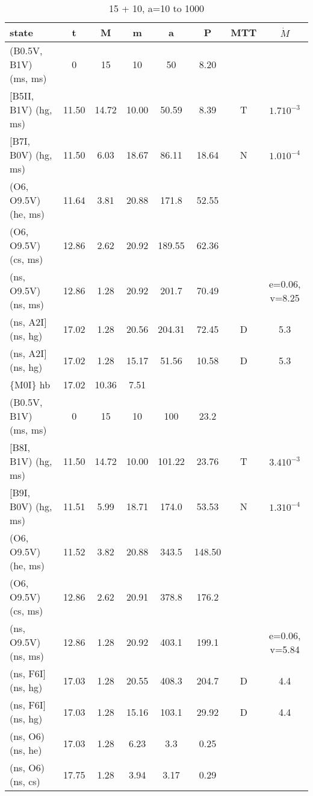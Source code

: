 \documentclass{article}
\begin{document}
\begin{table}
\caption{15 + 10, a=10 to 1000}
\begin{tabular}{p{4cm}ccccccc}
\hline
state 		    	& t 	& M	& m	& a	& P	& MTT	&$\dot{M}$		\\ \hline 
(B0.5V, B1V) (ms, ms)	& 0	& 15	& 10	& 50	& 8.20	&       &			\\
$[$B5II, B1V) (hg, ms)	& 11.50	& 14.72	& 10.00	& 50.59	& 8.39	& T	& $1.7 10^{-3}$		\\
$[$B7I, B0V) (hg, ms)	& 11.50	& 6.03	& 18.67	& 86.11	& 18.64	& N	& $1.0 10^{-4}$		\\
(O6, O9.5V) (he, ms)	& 11.64	& 3.81	& 20.88	& 171.8	& 52.55	&       &                       \\
(O6, O9.5V) (cs, ms)	& 12.86	& 2.62	& 20.92	& 189.55& 62.36	&       &                       \\
(ns, O9.5V) (ns, ms)	& 12.86	& 1.28	& 20.92	& 201.7	& 70.49	&       & e=0.06, v=8.25        \\
(ns, A2I$]$ (ns, hg)	& 17.02	& 1.28	& 20.56	& 204.31& 72.45	& D	& 5.3         		\\
(ns, A2I$]$ (ns, hg)	& 17.02	& 1.28	& 15.17	& 51.56 & 10.58	& D	& 5.3         		\\
\{M0I\} hb        	& 17.02	& 10.36	& 7.51 	&       &      	&    	&             		\\ 
\hline
(B0.5V, B1V) (ms, ms)	& 0	& 15	& 10	& 100	& 23.2	&       &			\\
$[$B8I, B1V) (hg, ms)	& 11.50	& 14.72	& 10.00	& 101.22& 23.76	& T	& $3.4 10^{-3}$		\\
$[$B9I, B0V) (hg, ms)	& 11.51	& 5.99	& 18.71	& 174.0	& 53.53	& N	& $1.3 10^{-4}$		\\
(O6, O9.5V) (he, ms)	& 11.52	& 3.82	& 20.88	& 343.5 & 148.50&       &                       \\
(O6, O9.5V) (cs, ms)	& 12.86	& 2.62	& 20.91	& 378.8 & 176.2	&       &                       \\
(ns, O9.5V) (ns, ms)	& 12.86	& 1.28	& 20.92	& 403.1	& 199.1	&       & e=0.06, v=5.84        \\
(ns, F6I$]$ (ns, hg)	& 17.03	& 1.28	& 20.55	& 408.3 & 204.7	& D	& 4.4         		\\
(ns, F6I$]$ (ns, hg)	& 17.03	& 1.28	& 15.16	& 103.1 & 29.92	& D	& 4.4         		\\
(ns, O6) (ns, he)	& 17.03	& 1.28	& 6.23 	& 3.3   & 0.25 	&  	&             		\\
(ns, O6) (ns, cs)	& 17.75	& 1.28	& 3.94 	& 3.17  & 0.29 	&  	&               	\\

\end{tabular}
\end{table}
\end{document}
